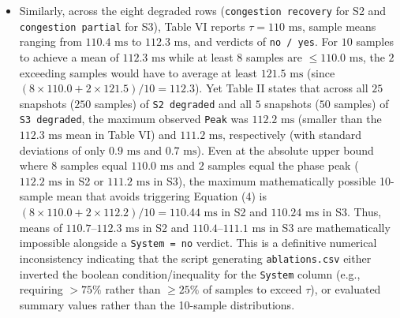 \documentclass[11pt,a4paper]{article}
\begin{document}
\begin{itemize}[leftmargin=1.8em,itemsep=2pt]
\item Similarly, across the eight degraded rows (\texttt{congestion recovery} for S2 and \texttt{congestion partial} for S3), Table VI reports $\tau = 110\text{ ms}$, sample means ranging from $110.4\text{ ms}$ to $112.3\text{ ms}$, and verdicts of \texttt{no / yes}. For $10$ samples to achieve a mean of $112.3\text{ ms}$ while at least $8$ samples are $\le 110.0\text{ ms}$, the $2$ exceeding samples would have to average at least $121.5\text{ ms}$ (since $(8 \times 110.0 + 2 \times 121.5)/10 = 112.3$). Yet Table II states that across all $25$ snapshots ($250$ samples) of \texttt{S2 degraded} and all $5$ snapshots ($50$ samples) of \texttt{S3 degraded}, the maximum observed \texttt{Peak} was $112.2\text{ ms}$ (smaller than the $112.3\text{ ms}$ mean in Table VI) and $111.2\text{ ms}$, respectively (with standard deviations of only $0.9\text{ ms}$ and $0.7\text{ ms}$). Even at the absolute upper bound where $8$ samples equal $110.0\text{ ms}$ and $2$ samples equal the phase peak ($112.2\text{ ms}$ in S2 or $111.2\text{ ms}$ in S3), the maximum mathematically possible 10-sample mean that avoids triggering Equation (4) is $(8 \times 110.0 + 2 \times 112.2)/10 = 110.44\text{ ms}$ in S2 and $110.24\text{ ms}$ in S3. Thus, means of $110.7\text{--}112.3\text{ ms}$ in S2 and $110.4\text{--}111.1\text{ ms}$ in S3 are mathematically impossible alongside a \texttt{System = no} verdict. This is a definitive numerical inconsistency indicating that the script generating \texttt{ablations.csv} either inverted the boolean condition/inequality for the \texttt{System} column (e.g., requiring $>75\%$ rather than $\ge 25\%$ of samples to exceed $\tau$), or evaluated summary values rather than the 10-sample distributions.

\end{itemize}
\end{document}
